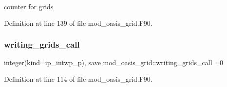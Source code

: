 counter for grids 



Definition at line 139 of file mod\+\_\+oasis\+\_\+grid.\+F90.

\mbox{\label{namespacemod__oasis__grid_a587c160986cc015e4367b1cca13babfb}} 
\subsubsection{\texorpdfstring{writing\+\_\+grids\+\_\+call}{writing\_grids\_call}}
{\footnotesize\ttfamily integer(kind=ip\+\_\+intwp\+\_\+p), save mod\+\_\+oasis\+\_\+grid\+::writing\+\_\+grids\+\_\+call =0\hspace{0.3cm}{\ttfamily [private]}}



Definition at line 114 of file mod\+\_\+oasis\+\_\+grid.\+F90.

